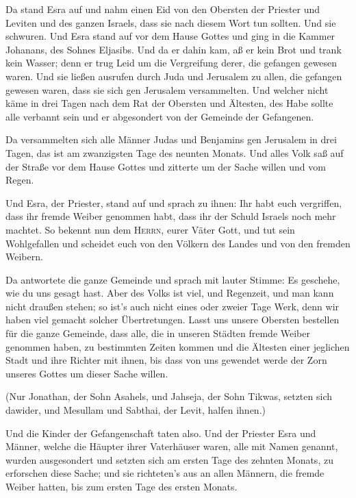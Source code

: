  Da stand Esra auf und nahm einen Eid von den Obersten der
Priester und Leviten und des ganzen Israels, dass sie nach diesem Wort
tun sollten. Und sie schwuren.  Und Esra stand auf vor dem
Hause Gottes und ging in die Kammer Johanans, des Sohnes Eljasibs. Und
da er dahin kam, aß er kein Brot und trank kein Wasser; denn er trug
Leid um die Vergreifung derer, die gefangen gewesen waren.
 Und sie ließen ausrufen durch Juda und Jerusalem zu
allen, die gefangen gewesen waren, dass sie sich gen Jerusalem
versammelten.  Und welcher nicht käme in drei Tagen nach
dem Rat der Obersten und Ältesten, des Habe sollte alle verbannt sein
und er abgesondert von der Gemeinde der Gefangenen.

 Da versammelten sich alle Männer Judas und Benjamins gen
Jerusalem in drei Tagen, das ist am zwanzigsten Tage des neunten Monats.
Und alles Volk saß auf der Straße vor dem Hause Gottes und zitterte um
der Sache willen und vom Regen.

 Und Esra, der Priester, stand auf und sprach zu ihnen:
Ihr habt euch vergriffen, dass ihr fremde Weiber genommen habt, dass ihr
der Schuld Israels noch mehr machtet.  So bekennt nun dem
\textsc{Herrn}, eurer Väter Gott, und tut sein Wohlgefallen und scheidet
euch von den Völkern des Landes und von den fremden Weibern.

 Da antwortete die ganze Gemeinde und sprach mit lauter
Stimme: Es geschehe, wie du uns gesagt hast.  Aber des
Volks ist viel, und Regenzeit, und man kann nicht draußen stehen; so
ist's auch nicht eines oder zweier Tage Werk, denn wir haben viel
gemacht solcher Übertretungen.  Lasst uns unsere Obersten
bestellen für die ganze Gemeinde, dass alle, die in unseren Städten
fremde Weiber genommen haben, zu bestimmten Zeiten kommen und die
Ältesten einer jeglichen Stadt und ihre Richter mit ihnen, bis dass von
uns gewendet werde der Zorn unseres Gottes um dieser Sache willen.

 (Nur Jonathan, der Sohn Asahels, und Jahseja, der Sohn
Tikwas, setzten sich dawider, und Mesullam und Sabthai, der Levit,
halfen ihnen.)

 Und die Kinder der Gefangenschaft taten also. Und der
Priester Esra und Männer, welche die Häupter ihrer Vaterhäuser waren,
alle mit Namen genannt, wurden ausgesondert und setzten sich am ersten
Tage des zehnten Monats, zu erforschen diese Sache;  und
sie richteten's aus an allen Männern, die fremde Weiber hatten, bis zum
ersten Tage des ersten Monats.

